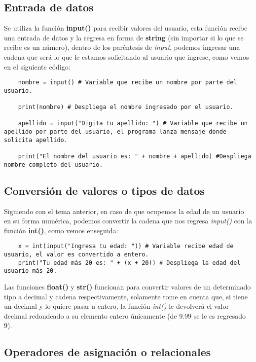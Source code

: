 \subsection{Entrada de datos}

Se utiliza la función \textbf{input()} para recibir valores del usuario, esta función recibe una entrada de datos y la regresa en forma de \textbf{string} (sin importar si lo que se recibe es un número), dentro de los paréntesis de \textit{input}, podemos ingresar una cadena que será lo que le estamos solicitando al usuario que ingrese, como vemos en el siguiente código:
\begin{lstlisting}
    nombre = input() # Variable que recibe un nombre por parte del usuario.

    print(nombre) # Despliega el nombre ingresado por el usuario.

    apellido = input("Digita tu apellido: ") # Variable que recibe un apellido por parte del usuario, el programa lanza mensaje donde solicita apellido.

    print("El nombre del usuario es: " + nombre + apellido) #Despliega nombre completo del usuario.
\end{lstlisting}


\subsection{Conversión de valores o tipos de datos}

Siguiendo con el tema anterior, en caso de que ocupemos la edad de un usuario en su forma numérica, podemos convertir la cadena que nos regresa \textit{input()} con la función \textbf{int()}, como vemos enseguida:
\begin{lstlisting}
    x = int(input("Ingresa tu edad: ")) # Variable recibe edad de usuario, el valor es convertido a entero.
    print("Tu edad más 20 es: " + (x + 20)) # Despliega la edad del usuario más 20.
\end{lstlisting}

Las funciones \textbf{float()} y \textbf{str()} funcionan para convertir valores de un determinado tipo a decimal y cadena respectivamente, solamente tome en cuenta que, si tiene un decimal y lo quiere pasar a entero, la función \textit{int()} le devolverá el valor decimal redondeado a su elemento entero únicamente (de 9.99 se le es regresado 9).


\subsection{Operadores de asignación o relacionales}

